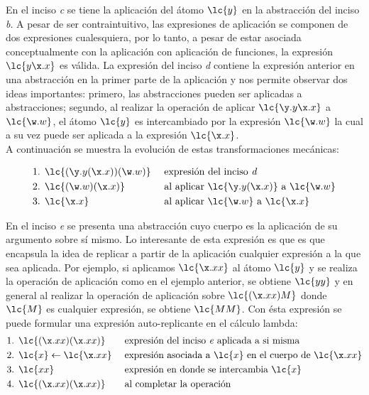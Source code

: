 En el inciso \emph{c} se tiene la aplicación del átomo \(\lc{y}\) en la
abstracción del inciso \emph{b}. A pesar de ser contraintuitivo, las expresiones
de aplicación se componen de dos expresiones cualesquiera, por lo tanto, a pesar
de estar asociada conceptualmente con la aplicación con aplicación de funciones,
la expresión \(\lc{y\x.x}\) es válida. La expresión del inciso \emph{d} contiene
la expresión anterior en una abstracción en la primer parte de la aplicación y
nos permite observar dos ideas importantes: primero, las abstracciones pueden ser
aplicadas a abstracciones; segundo, al realizar la operación de aplicar
\(\lc{\y.y\x.x}\) a \(\lc{\w.w}\), el átomo \(\lc{y}\) es intercambiado por la
expresión \(\lc{\w.w}\) la cual a su vez puede ser aplicada a la expresión
\(\lc{\x.x}\). \\

A continuación se muestra la evolución de estas transformaciones mecánicas:

\begin{align*} 
  \text{1. } &\lc{(\y.y(\x.x))(\w.w)} & &\text{ expresión del inciso \emph{d}}\\ 
  \text{2. } &\lc{(\w.w)(\x.x)} & &\text{ al aplicar } \lc{\y.y(\x.x)} \text{ a } \lc{\w.w}\\ 
  \text{3. } &\lc{\x.x} & &\text{ al aplicar } \lc{\w.w} \text{ a } \lc{\x.x}
\end{align*}

En el inciso \emph{e} se presenta una abstracción cuyo cuerpo es la aplicación
de su argumento sobre sí mismo. Lo interesante de esta expresión es que
es que encapsula la idea de replicar a partir de la aplicación cualquier
expresión a la que sea aplicada. Por ejemplo, si aplicamos \(\lc{\x.x x}\) al
átomo \(\lc{y}\) y se realiza la operación de aplicación como en el ejemplo
anterior, se obtiene \(\lc{y y}\) y en general al realizar la operación de
aplicación sobre \(\lc{(\x.x x)M}\) donde \(\lc{M}\) es cualquier expresión, se
obtiene \(\lc{M M}\). Con ésta expresión se puede formular una expresión
auto-replicante en el cálculo lambda: \\

\begin{align*} 
  \text{1. } &\lc{(\x.x x)(\x.x x)} & &\text{ expresión del inciso \emph{e} aplicada a si misma}\\
  \text{2. } &\lc{x} \leftarrow \lc{\x.x x} & &\text{ expresión asociada a } \lc{x} \text{ en el cuerpo de } \lc{\x.x x}\\ 
  \text{3. } &\lc{x x} & &\text{ expresión en donde se intercambia } \lc{x}\\
  \text{4. } &\lc{(\x.x x)(\x.x x)} & &\text{ al completar la operación}
\end{align*}

